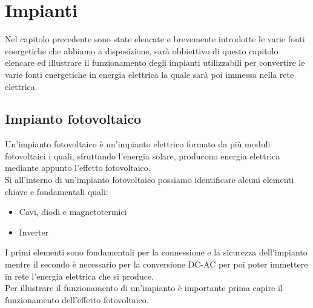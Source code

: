 
\chapter{Impianti}
\label{chp:impianti}
Nel capitolo precedente sono state elencate e brevemente introdotte le varie fonti energetiche che abbiamo a disposizione, sarà obbiettivo di questo capitolo elencare ed illustrare il funzionamento degli impianti utilizzabili per convertire le varie fonti energetiche in energia elettrica la quale sarà poi immessa nella rete elettrica.\\
\section{Impianto fotovoltaico}
Un'impianto fotovoltaico è un'impianto elettrico formato da più moduli fotovoltaici i quali, sfruttando l'energia solare, producono energia elettrica mediante appunto l'effetto fotovoltaico.\\
Si all'interno di un'impianto fotovoltaico possiamo identificare alcuni elementi chiave e fondamentali quali:
\begin{itemize}
    \item Cavi, diodi e magnetotermici
    \item Inverter
\end{itemize}
I primi elementi sono fondamentali per la connessione e la sicurezza dell'impianto mentre il secondo è necessario per la conversione DC-AC per poi poter immettere in rete l'energia elettrica che si produce.\\
Per illustrare il funzionamento di un'impianto è importante prima capire il funzionamento dell'effetto fotovoltaico.\\
